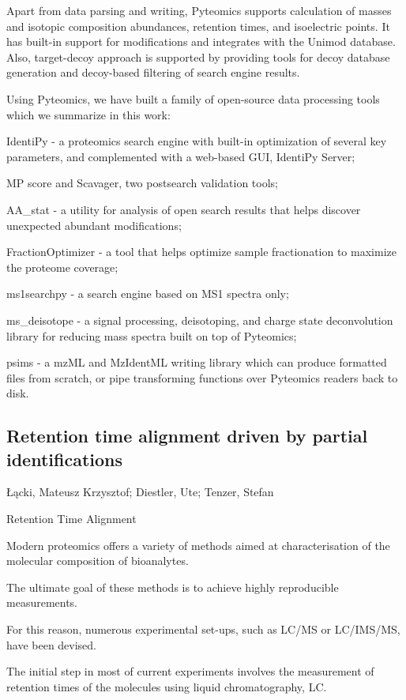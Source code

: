 {Apart from data parsing and writing, Pyteomics supports calculation of masses and isotopic composition abundances, retention times, and isoelectric points. It has built-in support for modifications and integrates with the Unimod database. Also, target-decoy approach is supported by providing tools for decoy database generation and decoy-based filtering of search engine results.

Using Pyteomics, we have built a family of open-source data processing tools which we summarize in this work:

IdentiPy - a proteomics search engine with built-in optimization of several key parameters, and complemented with a web-based GUI, IdentiPy Server;

MP score and Scavager, two postsearch validation tools;

AA\_stat - a utility for analysis of open search results that helps discover unexpected abundant modifications;

FractionOptimizer - a tool that helps optimize sample fractionation to maximize the proteome coverage;

ms1searchpy - a search engine based on MS1 spectra only;

ms\_deisotope - a signal processing, deisotoping, and charge state deconvolution library for reducing mass spectra built on top of Pyteomics;

psims - a mzML and MzIdentML writing library which can produce formatted files from scratch, or pipe transforming functions over Pyteomics readers back to disk.


\subsection*{\color{eubicRed} Retention time alignment driven by partial identifications}
{\color{eubicGray}Łącki, Mateusz Krzysztof;
Diestler, Ute;
Tenzer, Stefan}

Retention Time Alignment

Modern proteomics offers a variety of methods aimed at characterisation of the molecular composition of bioanalytes.

The ultimate goal of these methods is to achieve highly reproducible measurements.

For this reason, numerous experimental set-ups, such as LC/MS or LC/IMS/MS, have been devised.

The initial step in most of current experiments involves the measurement of retention times of the molecules using liquid chromatography, LC.

}
